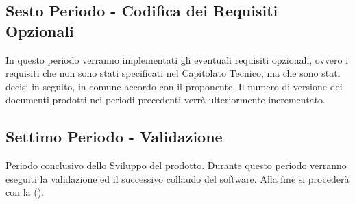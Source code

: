 \documentclass[../PianoDiProgetto_v4.0.0.tex]{subfiles}
\begin{document}
	\subsection{Sesto Periodo - Codifica dei Requisiti Opzionali}
	In questo periodo verranno implementati gli eventuali requisiti opzionali, ovvero i requisiti che non sono stati specificati nel Capitolato Tecnico, ma che sono stati decisi in seguito, in comune accordo con il proponente. Il numero di versione dei documenti prodotti nei periodi precedenti verrà ulteriormente incrementato.
		
	\subsection{Settimo Periodo - Validazione}
	Periodo conclusivo dello Sviluppo del prodotto. Durante questo periodo verranno eseguiti la validazione ed il successivo collaudo del software. Alla fine si procederà con la \revisionediaccettazione (). \\
\end{document}
